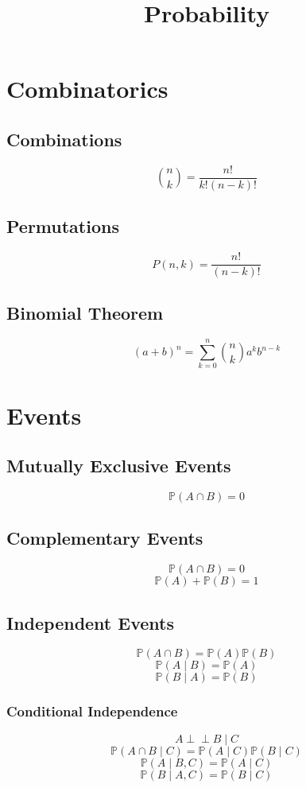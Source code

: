 \documentclass{article}
\title{Probability}
\date{}
\begin{document}
\maketitle

\tableofcontents

\newpage
\section{Combinatorics}

\subsection{Combinations}
\[
    \binom{n}{k} = \frac{n!}{k!(n-k)!}
\]

\subsection{Permutations}
\[
    P(n, k) = \frac{n!}{(n-k)!}
\]

\subsection{Binomial Theorem}
\[
    (a+b)^n = \sum_{k=0}^{n} \binom{n}{k} a^k b^{n-k}
\]

\newpage
\section{Events}

\subsection{Mutually Exclusive Events}
\[
    \mathbb{P}(A \cap B) = 0
\]

\subsection{Complementary Events}
\[
    \mathbb{P}(A \cap B) = 0
\]
\[
    \mathbb{P}(A) + \mathbb{P}(B) = 1
\]

\subsection{Independent Events}
\[
    \mathbb{P}(A \cap B) = \mathbb{P}(A)\mathbb{P}(B)
\]
\[
    \mathbb{P}(A \mid B) = \mathbb{P}(A)
\]
\[
    \mathbb{P}(B \mid A) = \mathbb{P}(B)
\]

\subsubsection{Conditional Independence}
\[
    A \perp\!\!\!\perp B \mid C
\]
\[
    \mathbb{P}(A \cap B \mid C) = \mathbb{P}(A \mid C) \mathbb{P}(B \mid C)
\]
\[
    \mathbb{P}(A \mid B, C) = \mathbb{P}(A \mid C)
\]
\[
    \mathbb{P}(B \mid A, C) = \mathbb{P}(B \mid C)
\]
\end{document}
